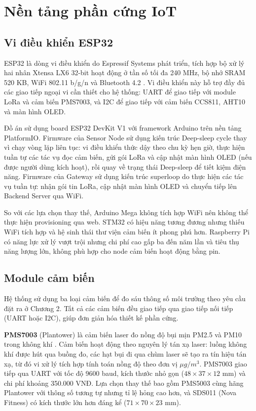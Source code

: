\documentclass[../DoAn.tex]{subfiles}
\begin{document}
\section{Nền tảng phần cứng IoT}
\label{section:3.2}

\subsection{Vi điều khiển ESP32}
\label{subsection:3.2.1}

ESP32 là dòng vi điều khiển do Espressif Systems phát triển, tích hợp bộ xử lý hai nhân Xtensa LX6 32-bit hoạt động ở tần số tối đa 240 MHz, bộ nhớ SRAM 520 KB, WiFi 802.11 b/g/n và Bluetooth 4.2 \cite{espressif2024}. Vi điều khiển này hỗ trợ đầy đủ các giao tiếp ngoại vi cần thiết cho hệ thống: \gls{UART} để giao tiếp với module \gls{LoRa} và cảm biến PMS7003, và I2C để giao tiếp với cảm biến CCS811, AHT10 và màn hình OLED.

Đồ án sử dụng board ESP32 DevKit V1 với framework Arduino trên nền tảng PlatformIO. Firmware của Sensor Node sử dụng kiến trúc Deep-sleep cycle thay vì chạy vòng lặp liên tục: vi điều khiển thức dậy theo chu kỳ hẹn giờ, thực hiện tuần tự các tác vụ đọc cảm biến, gửi gói \gls{LoRa} và cập nhật màn hình OLED (nếu được người dùng kích hoạt), rồi quay về trạng thái Deep-sleep để tiết kiệm điện năng. Firmware của Gateway sử dụng kiến trúc superloop do thực hiện các tác vụ tuần tự: nhận gói tin \gls{LoRa}, cập nhật màn hình OLED và chuyển tiếp lên Backend Server qua WiFi.

So với các lựa chọn thay thế, Arduino Mega không tích hợp WiFi nên không thể thực hiện provisioning qua web. STM32 có hiệu năng tương đương nhưng thiếu WiFi tích hợp và hệ sinh thái thư viện cảm biến ít phong phú hơn. Raspberry Pi có năng lực xử lý vượt trội nhưng chi phí cao gấp ba đến năm lần và tiêu thụ năng lượng lớn, không phù hợp cho node cảm biến hoạt động bằng pin.

\subsection{Module cảm biến}
\label{subsection:3.2.2}

Hệ thống sử dụng ba loại cảm biến để đo sáu thông số môi trường theo yêu cầu đặt ra ở Chương 2. Tất cả các cảm biến đều giao tiếp qua giao tiếp nối tiếp (\gls{UART} hoặc I2C), giúp đơn giản hóa thiết kế phần cứng.

\textbf{PMS7003} (Plantower) là cảm biến laser đo nồng độ bụi mịn PM2.5 và PM10 trong không khí \cite{plantower2023}. Cảm biến hoạt động theo nguyên lý tán xạ laser: luồng không khí được hút qua buồng đo, các hạt bụi đi qua chùm laser sẽ tạo ra tín hiệu tán xạ, từ đó vi xử lý tích hợp tính toán nồng độ theo đơn vị $\mu g/m^3$. PMS7003 giao tiếp qua \gls{UART} với tốc độ 9600 baud, kích thước nhỏ gọn ($48 \times 37 \times 12$ mm) và chi phí khoảng 350.000 VNĐ. Lựa chọn thay thế bao gồm PMS5003 cùng hãng Plantower với thông số tương tự nhưng tỉ lệ hỏng cao hơn, và SDS011 (Nova Fitness) có kích thước lớn hơn đáng kể ($71 \times 70 \times 23$ mm).
\end{document}

